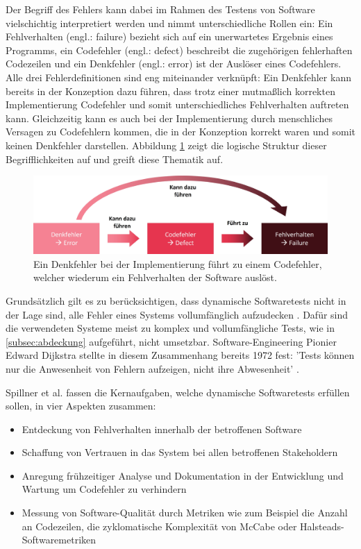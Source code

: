 Der Begriff des Fehlers kann dabei im Rahmen des Testens von Software vielschichtig interpretiert werden und nimmt unterschiedliche Rollen ein: Ein Fehlverhalten (engl.: failure) bezieht sich auf ein unerwartetes Ergebnis eines Programms, ein Codefehler (engl.: defect) beschreibt die zugehörigen fehlerhaften Codezeilen und ein Denkfehler (engl.: error) ist der Auslöser eines Codefehlers. Alle drei Fehlerdefinitionen sind eng miteinander verknüpft: Ein Denkfehler kann bereits in der Konzeption dazu führen, dass trotz einer mutmaßlich korrekten Implementierung Codefehler und somit unterschiedliches Fehlverhalten auftreten kann. Gleichzeitig kann es auch bei der Implementierung durch menschliches Versagen zu Codefehlern kommen, die in der Konzeption korrekt waren und somit keinen Denkfehler darstellen. Abbildung \ref{fig:fehler} zeigt die logische Struktur dieser Begrifflichkeiten auf und greift diese Thematik auf.

\begin{figure}[!h]
\centering
\includegraphics[width=0.8\columnwidth]{images/Fehler_Definition.jpg}
\caption{Ein Denkfehler bei der Implementierung führt zu einem Codefehler, welcher wiederum ein Fehlverhalten der Software auslöst.}
\label{fig:fehler}
\end{figure}

Grundsätzlich gilt es zu berücksichtigen, dass dynamische Softwaretests nicht in der Lage sind, alle Fehler eines Systems vollumfänglich aufzudecken \cite[S. 247]{sommerville2012software-engineering}. Dafür sind die verwendeten Systeme meist zu komplex und vollumfängliche Tests, wie in \autoref{subsec:abdeckung} aufgeführt, nicht umsetzbar. Software-Engineering Pionier Edward Dijkstra stellte in diesem Zusammenhang bereits 1972 fest: 'Tests können nur die Anwesenheit von Fehlern aufzeigen, nicht ihre Abwesenheit' \cite{dahl1972structured}.

Spillner et al. \cite[S. 8]{spillner2011software} fassen die Kernaufgaben, welche dynamische Softwaretests erfüllen sollen, in vier Aspekten zusammen:
\begin{itemize}
\item Entdeckung von Fehlverhalten innerhalb der betroffenen Software
\item Schaffung von Vertrauen in das System bei allen betroffenen Stakeholdern
\item Anregung frühzeitiger Analyse und Dokumentation in der Entwicklung und Wartung um Codefehler zu verhindern
\item Messung von Software-Qualität durch Metriken wie zum Beispiel die Anzahl an Codezeilen, die zyklomatische Komplexität von McCabe \cite{mccabe1976complexity} oder Halsteads-Softwaremetriken \cite{halstead1977elements}
\end{itemize}


